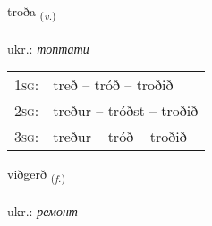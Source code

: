 \documentclass[frontgrid, backgrid]{flacards}\usepackage[]{graphicx}\usepackage[]{xcolor}
\begin{document}
\renewcommand{\flhead}{\vskip5pt \fboxsep=0pt {\small\bfseries\footnotesize Sagnorð | дієслово}}
\renewcommand{\fcfoot}{\vskip5pt \fboxsep=0pt \hspace{2pt}{\small\bfseries\footnotesize 3K}}

\renewcommand{\blhead}{\vskip5pt {\small\bfseries\footnotesize Sagnorð | дієслово }}
\renewcommand{\bcfoot}{\vskip5pt \hspace{2pt}{\small\bfseries\footnotesize 3K}}


{troða \small{\textsubscript{(\textit{v.})}} \\[1ex] %
\textphonetic{[tʰrɔːða]} \\
ukr.: \emph{топтати} \\  [2ex]
\renewcommand*{\arraystretch}{0.8}
\begin{tabular}{p{1cm}l}
\textsc{1sg}: & treð -- tróð -- troðið \\ 
\textsc{2sg}: & treður -- tróðst -- troðið \\ 
\textsc{3sg}: & treður -- tróð -- troðið \\ 
\end{tabular}
}

\renewcommand{\flhead}{\vskip5pt \fboxsep=0pt {\small\bfseries\footnotesize Nafnorð | іменник}}
\renewcommand{\fcfoot}{\vskip5pt \fboxsep=0pt \hspace{2pt}{\small\bfseries\footnotesize 3K}}

\renewcommand{\blhead}{\vskip5pt {\small\bfseries\footnotesize Nafnorð | іменник }}
\renewcommand{\bcfoot}{\vskip5pt \hspace{2pt}{\small\bfseries\footnotesize 3K}}


{viðgerð \small{\textsubscript{(\textit{f.})}} \\[1ex] %
\textphonetic{[vɪðcɛrð]} \\
ukr.: \emph{ремонт} \\  [2ex]
\renewcommand*{\arraystretch}{0.8}
}
\end{document}
